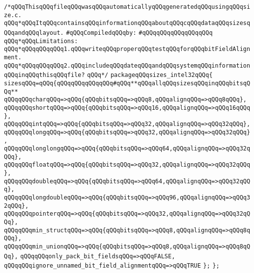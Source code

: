 \label{src/app/c-glue-maker/sizes-intel32.pkg}
\verb|/*qQQqThisqQQqfileqQQqwasqQQqautomaticallyqQQqgeneratedqQQqusingqQQqsize.c.|\newline
\verb|qQQq*qQQqItqQQqcontainsqQQqinformationqQQqaboutqQQqcqQQqdataqQQqsizesqQQqandqQQqlayout.|\newline
\newline
\verb|#qQQqCompiledqQQqby:|\newline
\verb|#qQQqqQQqqQQqqQQqqQQq|\newline
\newline
\verb|qQQq*qQQqLimitations:|\newline
\verb|qQQq*qQQqqQQqqQQq1.qQQqwriteqQQqproperqQQqtestqQQqforqQQqbitFieldAlignment.|\newline
\verb|qQQq*qQQqqQQqqQQq2.qQQqincludeqQQqdateqQQqandqQQqsystemqQQqinformationqQQqinqQQqthisqQQqfile?|\newline
\verb|qQQq*/|\newline
\newline
\verb|packageqQQqsizes_intel32qQQq{|\newline
\verb|sizesqQQq=qQQq{qQQqqQQqqQQqqQQq#qQQq**qQQqallqQQqsizesqQQqinqQQqbitsqQQq**|\newline
\verb|qQQqqQQqcharqQQq=>qQQq{qQQqbitsqQQq=>qQQq8,qQQqalignqQQq=>qQQq8qQQq},|\newline
\verb|qQQqqQQqshortqQQq=>qQQq{qQQqbitsqQQq=>qQQq16,qQQqalignqQQq=>qQQq16qQQq},|\newline
\verb|qQQqqQQqintqQQq=>qQQq{qQQqbitsqQQq=>qQQq32,qQQqalignqQQq=>qQQq32qQQq},|\newline
\verb|qQQqqQQqlongqQQq=>qQQq{qQQqbitsqQQq=>qQQq32,qQQqalignqQQq=>qQQq32qQQq},|\newline
\verb|qQQqqQQqlonglongqQQq=>qQQq{qQQqbitsqQQq=>qQQq64,qQQqalignqQQq=>qQQq32qQQq},|\newline
\verb|qQQqqQQqfloatqQQq=>qQQq{qQQqbitsqQQq=>qQQq32,qQQqalignqQQq=>qQQq32qQQq},|\newline
\verb|qQQqqQQqdoubleqQQq=>qQQq{qQQqbitsqQQq=>qQQq64,qQQqalignqQQq=>qQQq32qQQq},|\newline
\verb|qQQqqQQqlongdoubleqQQq=>qQQq{qQQqbitsqQQq=>qQQq96,qQQqalignqQQq=>qQQq32qQQq},|\newline
\verb|qQQqqQQqpointerqQQq=>qQQq{qQQqbitsqQQq=>qQQq32,qQQqalignqQQq=>qQQq32qQQq},|\newline
\verb|qQQqqQQqmin_structqQQq=>qQQq{qQQqbitsqQQq=>qQQq8,qQQqalignqQQq=>qQQq8qQQq},|\newline
\verb|qQQqqQQqmin_unionqQQq=>qQQq{qQQqbitsqQQq=>qQQq8,qQQqalignqQQq=>qQQq8qQQq},|\newline
\verb|qQQqqQQqonly_pack_bit_fieldsqQQq=>qQQqFALSE,|\newline
\verb|qQQqqQQqignore_unnamed_bit_field_alignmentqQQq=>qQQqTRUE|\newline
\verb|};|\newline
\verb|};|\newline

